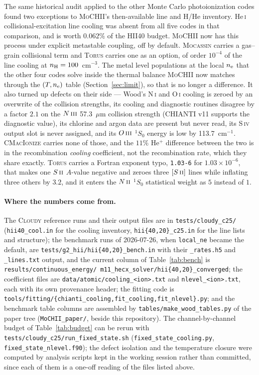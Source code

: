 \documentclass[english,a4paper]{my_memo}
\newcommand{\code}[1]{\texttt{#1}}
\newcommand{\MoCHII}{\textsc{MoCHII}}
\newcommand{\Cloudy}{\textsc{Cloudy}}
\newcommand{\Mocassin}{\textsc{Mocassin}}
\newcommand{\CMI}{\textsc{CMacIonize}}
\newcommand{\Torus}{\textsc{Torus}}
\newcommand{\HeI}{He\,\textsc{i}}
\newcommand{\OI}{O\,\textsc{i}}
\newcommand{\OIII}{O\,\textsc{iii}}
\newcommand{\NI}{N\,\textsc{i}}
\newcommand{\NII}{N\,\textsc{ii}}
\newcommand{\NIII}{N\,\textsc{iii}}
\newcommand{\SII}{S\,\textsc{ii}}
\newcommand{\SIV}{S\,\textsc{iv}}
\newcommand{\nel}{n_{\rm e}}
\newcommand{\nH}{n_{\rm H}}
\begin{document}
The same historical audit applied to the other Monte Carlo photoionization
codes found two exceptions to \MoCHII{}'s then-available line and H/He
inventory. \HeI{} collisional-excitation line cooling was absent from all
five codes in that comparison, and is worth $0.062\%$ of the HII40 budget.
\MoCHII{} now has this process under explicit metastable coupling, off by
default. \Mocassin{} carries a
gas--grain collisional term and \Torus{} carries one as an option, of order
$10^{-4}$ of the line cooling at
$\nH = 100$~cm$^{-3}$.  The metal level populations at the local $\nel$ that
the other four codes solve inside the thermal balance \MoCHII{} now matches
through the $(T, \nel)$ table (Section~\ref{sec:limit}), so that is no longer a
difference.  It also turned up defects on their side --- Wood's \NI{} and
\OI{} cooling is zeroed by an overwrite of the collision strengths, its cooling
and diagnostic routines disagree by a factor $2.1$ on the $\NIII{}$
57.3~$\mu$m collision strength (CHIANTI v11 supports the diagnostic value), its
chlorine and argon data are present but never read, its \SIV{} output slot is
never assigned, and its $\OIII{}$ $^1S_0$ energy is low by 113.7~cm$^{-1}$.
\CMI{} carries none of those, and the $11\%$ He$^+$ difference between the two
is in the recombination \emph{cooling} coefficient, not the recombination rate,
which they share exactly.  \Torus{} carries a Fortran exponent typo, \code{1.03-6}
for $1.03\times10^{-6}$, that makes one $\SII{}$ $A$-value negative and zeroes
three $[\SII{}]$ lines while inflating three others by $3.2$, and it enters the
$\NII{}$ $^1S_0$ statistical weight as $5$ instead of $1$.

\paragraph{Where the numbers come from.}  The \Cloudy{} reference runs and
their output files are in \code{tests/cloudy\_c25/} (\code{hii40\_cool.in} for
the cooling inventory, \code{hii\{40,20\}\_c25.in} for the line lists and
structure); the benchmark runs of 2026-07-26, when \code{local\_ne} became the
default, are \code{tests/g2\_hii/hii\{40,20\}\_bench.in} with their
\code{\_rates.h5} and \code{\_lines.txt} output, and the current column of
Table~\ref{tab:bench} is \code{results/\allowbreak continuous\_energy/\allowbreak
m11\_hecx\_solver/\allowbreak hii\{40,20\}\_converged}; the coefficient files are
\code{data/atomic/cooling\_<ion>.txt} and \code{nlevel\_<ion>.txt}, each with
its own provenance header; the fitting code is
\code{tools/\allowbreak fitting/\allowbreak \{chianti\_cooling,\allowbreak fit\_cooling,\allowbreak fit\_nlevel\}.py}; and the
benchmark table columns are assembled by \code{tables/make\_wood\_tables.py}
of the paper tree (\code{MoCHII\_paper/}, beside this repository).  The
channel-by-channel budget of Table~\ref{tab:budget} can be rerun with
\code{tests/\allowbreak cloudy\_c25/\allowbreak run\_fixed\_state.sh}
(\code{fixed\_state\_cooling.py}, \code{fixed\_state\_nlevel.f90}); the
defect isolation and the temperature closure were computed by analysis scripts
kept in the working session rather than committed, since each of them is a
one-off reading of the files listed above.
\end{document}
